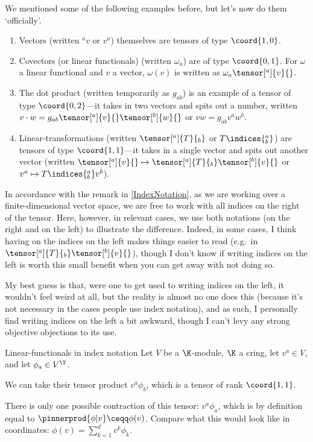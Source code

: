 We mentioned some of the following examples before, but let's now do them `officially'.
\begin{exm}{}{}
	\begin{enumerate}
		\item Vectors (written $^av$ or $v^a$) themselves are tensors of type $\coord{1,0}$.
		\item Covectors (or linear functionals) (written $\omega _a$) are of type $\coord{0,1}$.  For $\omega$ a linear functional and $v$ a vector, $\omega (v)$ is written as $\omega _a\tensor[^a]{v}{}$.
		\item The dot product (written temporarily as $g_{ab}$) is an example of a tensor of type $\coord{0,2}$---it takes in two vectors and spits out a number, written $v\cdot w=g_{ab}\tensor[^a]{v}{}\tensor[^b]{w}{}$ or $v\dot w=g_{ab}v^aw^b$.
		\item Linear-transformations (written $\tensor[^a]{T}{_b}$ or $T\indices{^a_b}$) are tensors of type $\coord{1,1}$---it takes in a single vector and spits out another vector (written $\tensor[^a]{v}{}\mapsto \tensor[^a]{T}{_b}\tensor[^b]{v}{}$ or $v^a\mapsto T\indices{^a_b}v^b$).
	\end{enumerate}
	\begin{rmk}
		In accordance with the remark in \cref{IndexNotation}, as we are working over a finite-dimensional vector space, we are free to work with all indices on the right of the tensor.  Here, however, in relevant cases, we use both notations (on the right and on the left) to illustrate the difference.  Indeed, in some cases, I think having on the indices on the left makes things easier to read (e.g.~in $\tensor[^a]{T}{_b}\tensor[^b]{v}{}$), though I don't know if writing indices on the left is worth this small benefit when you can get away with not doing so.
		
		My best guess is that, were one to get used to writing indices on the left, it wouldn't feel weird at all, but the reality is almost no one does this (because it's not necessary in the cases people use index notation), and as such, I personally find writing indices on the left a bit awkward, though I can't levy any strong objective objections to its use.
	\end{rmk}
\end{exm}
\begin{exm}{Linear-functionals in index notation}{}
	Let $V$ be a $\K$-module, $\K$ a cring, let $v^a\in V$, and let $\phi _a\in V^{\T}$.
	
	We can take their tensor product $v^a\phi _b$, which is a tensor of rank $\coord{1,1}$.
	
	There is only one possible contraction of this tensor:   $v^a\phi _a$, which is by definition equal to $\pinnerprod{\phi |v}\ceqq \phi (v)$.    Compare what this would look like in coordinates:  $\phi (v)=\sum _{k=1}^dv^k\phi _k$.
\end{exm}
